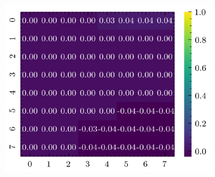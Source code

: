 \documentclass[../document.tex]{subfiles}
\begin{document}
\begin{figure}[H]
\begin{subfigure}[b]{0.19\textwidth}
        \includegraphics[width=\linewidth]{../img/5/quarry/best/heatmap-2d-4.png}
    \end{subfigure}  


\end{figure}
\end{document}
